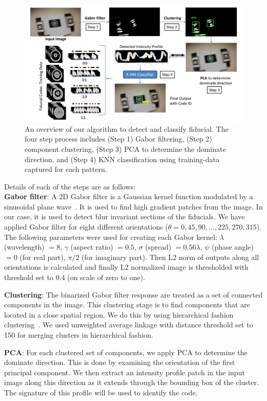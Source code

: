 \documentclass[runningheads]{llncs}
\begin{document}
\begin{figure}[ht!]
\includegraphics[width=\linewidth]{overall_flow.pdf}
\caption{An overview of our algorithm to detect and classify fiducial. 
The four step process includes (Step 1) Gabor filtering,
(Step 2) component clustering, (Step 3) PCA to determine the dominate direction, 
and (Step 4) KNN classification using training-data captured for each pattern.}
\label{fig:overall_flow}
\end{figure}

\noindent Details of each of the steps are as follows:\\
\noindent\textbf{Gabor filter}: A 2D Gabor filter is a Gaussian kernel function
modulated by a sinusoidal plane wave~\cite{Kruizinga:2002}. It is used to find
high gradient patches from the image. In our case, it is used to detect blur
invariant sections of the fiducials. We have applied Gabor filter for eight
different orientations ($\theta = 0, 45, 90, \ldots ,225, 270, 315$).  The
following parameters were used for creating each Gabor kernel: $\lambda$ (wavelength) $= 8$, $\gamma$
(aspect ratio) $= 0.5$, $\sigma$ (spread) $= 0.56\lambda$, $\psi$
(phase angle) $= 0$ (for real part), $\pi/2$ (for imaginary part).
Then L2 norm of outputs along all orientations is calculated and finally L2
normalized image is thresholded with threshold set to $0.4$ (on scale of zero to
one).

\noindent\textbf{Clustering}: The binarized Gabor filter response are
treated as a set of connected components in the image.   This clustering
stage is to find components that are located in a close spatial region.  We do
this by using hierarchical fashion clustering~\cite{ALGLIB}. We used unweighted
average linkage with distance threshold set to 150 for merging clusters in
hierarchical fashion.

\noindent\textbf{PCA}: For each clustered set of components, we apply 
PCA to determine the dominate direction.  This is done by examining the
orientation of the first principal component.  We then extract an intensity
profile patch in the input image along this direction as it extends through the
bounding box of the cluster. The signature of this profile will be used to
identify the code.
\end{document}
